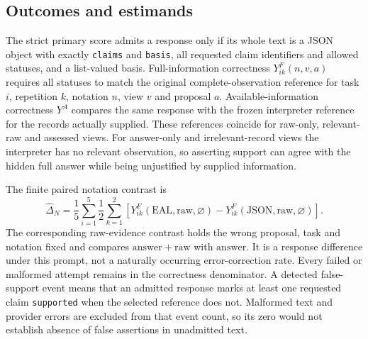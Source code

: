 \documentclass[preprint,12pt]{elsarticle}
\begin{document}
\subsection{Outcomes and estimands}
The strict primary score admits a response only if its whole text is a JSON object with exactly \texttt{claims} and \texttt{basis}, all requested claim identifiers and allowed statuses, and a list-valued basis. Full-information correctness \(Y^F_{ik}(n,v,a)\) requires all statuses to match the original complete-observation reference for task \(i\), repetition \(k\), notation \(n\), view \(v\) and proposal \(a\). Available-information correctness \(Y^A\) compares the same response with the frozen interpreter reference for the records actually supplied. These references coincide for raw-only, relevant-raw and assessed views. For answer-only and irrelevant-record views the interpreter has no relevant observation, so asserting support can agree with the hidden full answer while being unjustified by supplied information.

The finite paired notation contrast is
\begin{equation}
\widehat{\Delta}_{N}=
\frac{1}{5}\sum_{i=1}^{5}\frac{1}{2}\sum_{k=1}^{2}
\left[Y^F_{ik}(\mathrm{EAL},\mathrm{raw},\varnothing)
-Y^F_{ik}(\mathrm{JSON},\mathrm{raw},\varnothing)\right].
\label{eq:notation}
\end{equation}
The corresponding raw-evidence contrast holds the wrong proposal, task and notation fixed and compares \(\mathrm{answer+raw}\) with \(\mathrm{answer}\). It is a response difference under this prompt, not a naturally occurring error-correction rate. Every failed or malformed attempt remains in the correctness denominator. A detected false-support event means that an admitted response marks at least one requested claim \texttt{supported} when the selected reference does not. Malformed text and provider errors are excluded from that event count, so its zero would not establish absence of false assertions in unadmitted text.
\end{document}

